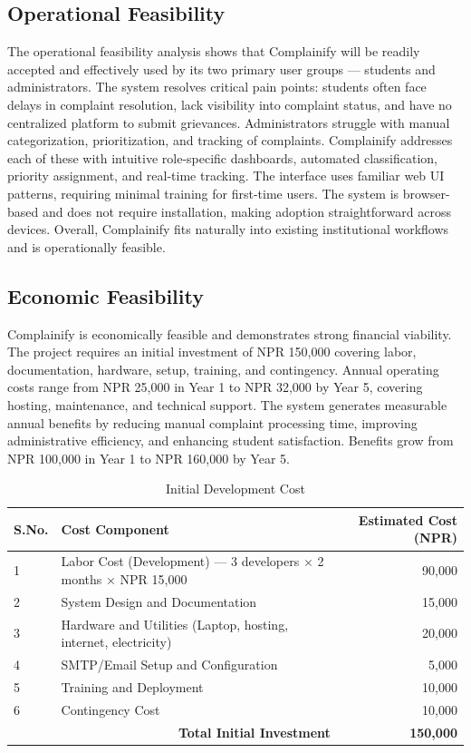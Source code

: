 \documentclass[12pt,a4paper]{report}
\begin{document}
\subsection{Operational Feasibility}
The operational feasibility analysis shows that Complainify will be readily accepted and effectively used by its two primary user groups — students and administrators. The system resolves critical pain points: students often face delays in complaint resolution, lack visibility into complaint status, and have no centralized platform to submit grievances. Administrators struggle with manual categorization, prioritization, and tracking of complaints. Complainify addresses each of these with intuitive role-specific dashboards, automated classification, priority assignment, and real-time tracking. The interface uses familiar web UI patterns, requiring minimal training for first-time users. The system is browser-based and does not require installation, making adoption straightforward across devices. Overall, Complainify fits naturally into existing institutional workflows and is operationally feasible.

\subsection{Economic Feasibility}
Complainify is economically feasible and demonstrates strong financial viability. The project requires an initial investment of NPR 150,000 covering labor, documentation, hardware, setup, training, and contingency. Annual operating costs range from NPR 25,000 in Year 1 to NPR 32,000 by Year 5, covering hosting, maintenance, and technical support. The system generates measurable annual benefits by reducing manual complaint processing time, improving administrative efficiency, and enhancing student satisfaction. Benefits grow from NPR 100,000 in Year 1 to NPR 160,000 by Year 5.

\begin{table}[H]
\centering
\caption{Initial Development Cost}
\begin{tabular}{lp{7cm}r}
\toprule
\textbf{S.No.} & \textbf{Cost Component} & \textbf{Estimated Cost (NPR)} \\
\midrule
1 & Labor Cost (Development) — 3 developers × 2 months × NPR 15,000 & 90,000 \\
2 & System Design and Documentation & 15,000 \\
3 & Hardware and Utilities (Laptop, hosting, internet, electricity) & 20,000 \\
4 & SMTP/Email Setup and Configuration & 5,000 \\
5 & Training and Deployment & 10,000 \\
6 & Contingency Cost & 10,000 \\
\midrule
\multicolumn{2}{r}{\textbf{Total Initial Investment}} & \textbf{150,000} \\
\bottomrule
\end{tabular}
\end{table}
\end{document}
